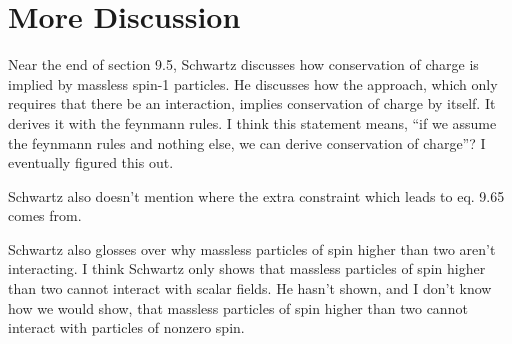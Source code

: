 \documentclass{article}
\begin{document}
\section{More Discussion}

Near the end of section 9.5, Schwartz discusses how conservation of 
	charge is implied by massless spin-1 particles.
He discusses how the approach, which only requires that there be an interaction,
	implies conservation of charge by itself.
It derives it with the feynmann rules.
I think this statement means, ``if we assume the feynmann rules and nothing
	else, we can derive conservation of charge''?
I eventually figured this out.

Schwartz also doesn't mention where the extra constraint which leads to eq. 9.65
	comes from.  

Schwartz also glosses over why massless particles of spin higher
	than two aren't interacting.
I think Schwartz only shows that massless particles of spin higher than
	two cannot interact with scalar fields.
He hasn't shown, and I don't know how we would show, that massless particles
	of spin higher than two cannot interact with particles of nonzero spin.
\end{document}
